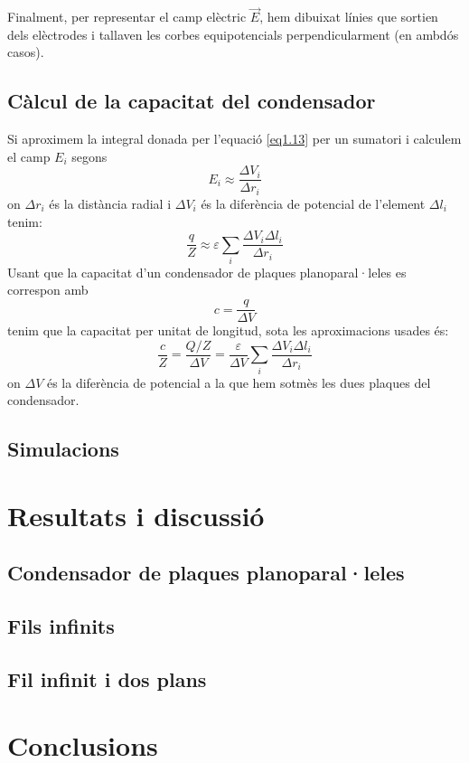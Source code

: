 \documentclass[a4paper,10.5pt]{report}
\begin{document}
	Finalment, per representar el camp elèctric $\vec{E}$, hem dibuixat línies que sortien dels elèctrodes i tallaven les corbes equipotencials perpendicularment (en ambdós casos). 
	
	\subsection{Càlcul de la capacitat del condensador}
	Si aproximem la integral donada per l'equació \eqref{eq1.13} per un sumatori i calculem el camp $E_i$ segons
	\begin{equation}
		E_i \approx \frac{\Delta V_i}{\Delta r_i}
	\end{equation}
	on $\Delta r_i$ és la distància radial i $\Delta V_i$ és la diferència de potencial de l'element $\Delta l_i$ tenim:
	\begin{equation}
		\frac{q}{Z} \approx \varepsilon \sum_i \frac{\Delta V_i \Delta l_i}{\Delta r_i}
	\end{equation}
	Usant que la capacitat d'un condensador de plaques planoparal·leles es correspon amb 
	\begin{equation}
		c = \frac{q}{\Delta V}
	\end{equation}
	tenim que la capacitat per unitat de longitud, sota les aproximacions usades és:
	\begin{equation}
		\frac{c}{Z} = \frac{Q/Z}{\Delta V} = \frac{\varepsilon}{\Delta V} \sum_i \frac{\Delta V_i \Delta l_i}{\Delta r_i}  
	\end{equation}
	on $\Delta V$ és la diferència de potencial a la que hem sotmès les dues plaques del condensador.
	
	\subsection{Simulacions}
	\section{Resultats i discussió}
	
	\subsection{Condensador de plaques planoparal·leles}
	
	\subsection{Fils infinits}

	\subsection{Fil infinit i dos plans}
	
	\section{Conclusions}
	
\end{document}
